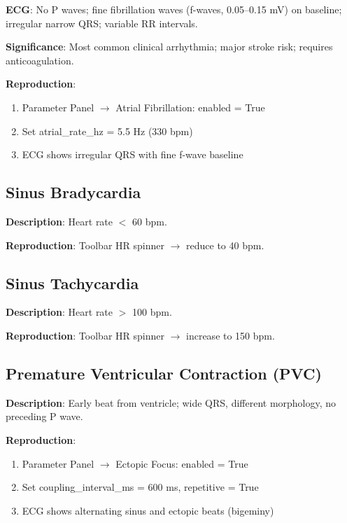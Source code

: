 \documentclass[12pt,oneside,a4paper]{book}
\begin{document}
\textbf{ECG}: No P waves; fine fibrillation waves (f-waves, 0.05--0.15 mV) on baseline; irregular narrow QRS; variable RR intervals.

\textbf{Significance}: Most common clinical arrhythmia; major stroke risk; requires anticoagulation.

\textbf{Reproduction}:
\begin{enumerate}
  \item Parameter Panel $\to$ Atrial Fibrillation: enabled = True
  \item Set atrial\_rate\_hz = 5.5 Hz (330 bpm)
  \item ECG shows irregular QRS with fine f-wave baseline
\end{enumerate}

\subsection{Sinus Bradycardia}

\textbf{Description}: Heart rate $<$ 60 bpm.

\textbf{Reproduction}: Toolbar HR spinner $\to$ reduce to 40 bpm.

\subsection{Sinus Tachycardia}

\textbf{Description}: Heart rate $>$ 100 bpm.

\textbf{Reproduction}: Toolbar HR spinner $\to$ increase to 150 bpm.

\subsection{Premature Ventricular Contraction (PVC)}

\textbf{Description}: Early beat from ventricle; wide QRS, different morphology, no preceding P wave.

\textbf{Reproduction}:
\begin{enumerate}
  \item Parameter Panel $\to$ Ectopic Focus: enabled = True
  \item Set coupling\_interval\_ms = 600 ms, repetitive = True
  \item ECG shows alternating sinus and ectopic beats (bigeminy)
\end{enumerate}

\end{document}
